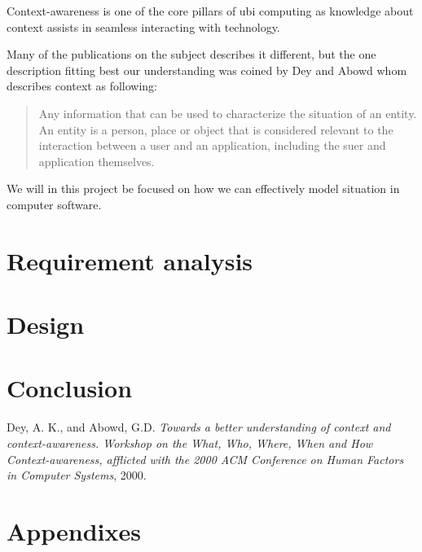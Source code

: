 \documentclass[]{report}
\begin{document}
Context-awareness is one of the core pillars of ubi computing as knowledge about context assists in seamless interacting with technology. 
 
Many of the publications on the subject describes it different, but the one description fitting best our understanding was coined by Dey and Abowd whom describes context as following:

\blockquote{
	Any information that can be used to characterize the situation of an entity. An entity is a person, place or object that is considered relevant to the interaction between a user and an application, including the suer and application themselves. \cite{Dey and Abowd (2000)} 
} 

We will in this project be focused on how we can effectively model situation in computer software.






  

\chapter{Requirement analysis}
\chapter{Design}
\chapter{Conclusion}

\begin{thebibliography}{9}

  Dey, A. K., and Abowd, G.D.
  \emph{Towards a better understanding of context and context-awareness. Workshop on the What, Who, Where, When and How Context-awareness, afflicted with the 2000 ACM Conference on Human Factors in Computer Systems},
  2000.

\end{thebibliography}
\chapter{Appendixes}
\end{document}
